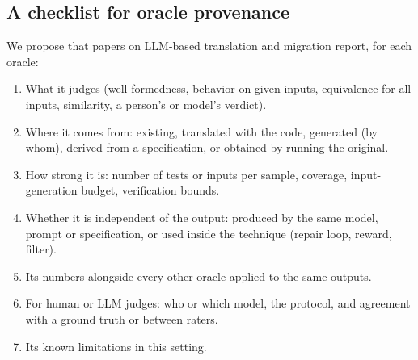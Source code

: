 \subsection{A checklist for oracle provenance}
\label{sec:checklist}

We propose that papers on LLM-based translation and migration report, for each oracle:
\begin{enumerate}
  \item What it judges (well-formedness, behavior on given inputs, equivalence for all inputs, similarity, a person's or model's verdict).
  \item Where it comes from: existing, translated with the code, generated (by whom), derived from a specification, or obtained by running the original.
  \item How strong it is: number of tests or inputs per sample, coverage, input-generation budget, verification bounds.
  \item Whether it is independent of the output: produced by the same model, prompt or specification, or used inside the technique (repair loop, reward, filter).
  \item Its numbers alongside every other oracle applied to the same outputs.
  \item For human or LLM judges: who or which model, the protocol, and agreement with a ground truth or between raters.
  \item Its known limitations in this setting.
\end{enumerate}
